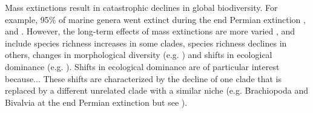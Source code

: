 \documentclass[12pt,letterpaper]{article}
\begin{document}
Mass extinctions result in catastrophic declines in global biodiversity. 
For example, 95\% of marine genera went extinct during the end Permian extinction \cite{RaupPT,BentonPT}, and %
. 
However, the long-term effects of mass extinctions are more varied \cite{Erwin1998344}, and include species richness increases in some clades, species richness declines in others, 
changes in morphological diversity (e.g. \cite{friedmanexplosive2010,brusattedinosaur2012}) and shifts in ecological dominance (e.g. \cite{Brusatte12092008,toljagictriassic-jurassic2013,bensonfaunal2014}). 
Shifts in ecological dominance are of particular interest because... %
These shifts are characterized by the decline of one clade that is replaced by a different unrelated clade with a similar niche \cite{Brusatte12092008} (e.g. Brachiopoda and Bivalvia at the end Permian extinction \cite{Sepkiski1981,CLAPHAM01102006} but see \cite{Payne22052014}). 
\end{document}
